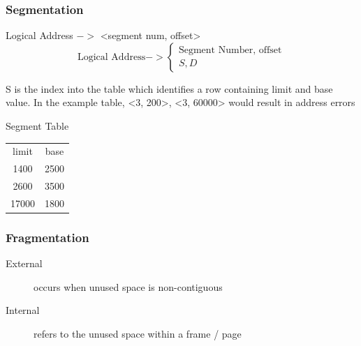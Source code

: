 \documentclass[a4paper]{article}
\begin{document}
\begin{multicols*}{2}
    \subsubsection*{Segmentation}
    Logical Address \(->\) <segment num, offset>
    \begin{equation*}
        \text{Logical Address} -> \begin{cases}
            \text{Segment Number, offset} \\
            S, D
        \end{cases}
    \end{equation*}
    \begin{multicols*}{2}
        S is the index into the table which identifies a row containing limit and base value.
        In the example table, <3, 200>, <3, 60000> would result in address errors
        \columnbreak
        \begin{center}
            Segment Table \\
            \begin{tabular}{c|c}
                limit & base \\
                1400  & 2500 \\
                2600  & 3500 \\
                17000 & 1800
            \end{tabular}
        \end{center}
    \end{multicols*}
    \subsubsection*{Fragmentation}
    \begin{description}
        \item[External] occurs when unused space is non-contiguous
        \item[Internal] refers to the unused space within a frame / page
    \end{description}


\end{multicols*}
\end{document}
